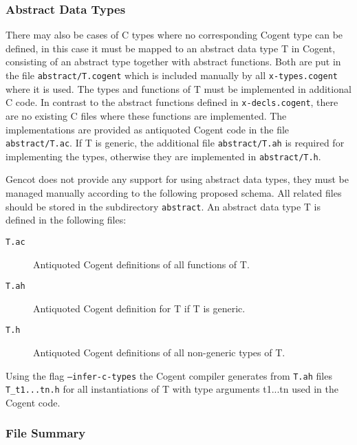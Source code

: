 \documentclass[a4paper]{report}
\newcommand{\code}[1]{\textnormal{\texttt{#1}}}
\begin{document}
\subsubsection{Abstract Data Types}

There may also be cases of C types where no corresponding Cogent type can be defined, in this case it must be mapped to an 
abstract data type T in Cogent, consisting of an abstract type together with abstract functions. Both are put in 
the file \code{abstract/T.cogent} which is included manually by all \code{x-types.cogent} where it is used. The types and 
functions of T must be implemented in additional C code. In contrast to the abstract functions defined in \code{x-decls.cogent},
there are no existing C files where these functions are implemented. The implementations are provided as antiquoted Cogent 
code in the file \code{abstract/T.ac}. If T is generic, the additional file \code{abstract/T.ah} is required for 
implementing the types, otherwise they are implemented in \code{abstract/T.h}. 

Gencot does not provide any support for using abstract data types, they must be managed manually according to the following
proposed schema. All related files should be stored in the subdirectory \code{abstract}.
An abstract data type T is defined in the following files:
\begin{description}
\item[\code{T.ac}] Antiquoted Cogent definitions of all functions of T. 
\item[\code{T.ah}] Antiquoted Cogent definition for T if T is generic.
\item[\code{T.h}] Antiquoted Cogent definitions of all non-generic types of T.
\end{description}
Using the flag \code{--infer-c-types} the Cogent compiler generates from \code{T.ah} files \code{T\_t1...tn.h} for all 
instantiations of T with type arguments t1...tn used in the Cogent code.

\subsubsection{File Summary}
\end{document}
